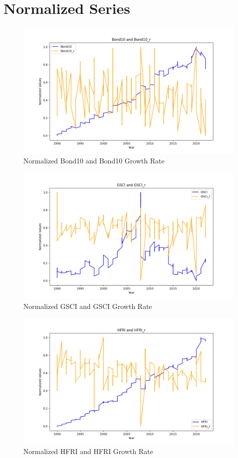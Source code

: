 \documentclass[12pt]{article}
\begin{document}
\section{Normalized Series}
\begin{figure}[H]
    \centering
    \includegraphics[width=0.75\linewidth]{Bond10_Bond10_r.png}
    \caption{Normalized Bond10 and Bond10 Growth Rate}
    \label{fig:enter-label}
\end{figure}
\begin{figure}[H]
    \centering
    \includegraphics[width=0.75\linewidth]{GSCI_GSCI_r.png}
    \caption{Normalized GSCI and GSCI Growth Rate}
    \label{fig:enter-label}
\end{figure}
\begin{figure}[H]
    \centering
    \includegraphics[width=0.75\linewidth]{HFRI_HFRI_r.png}
    \caption{Normalized HFRI and HFRI Growth Rate}
    \label{fig:enter-label}
\end{figure}
\end{document}
